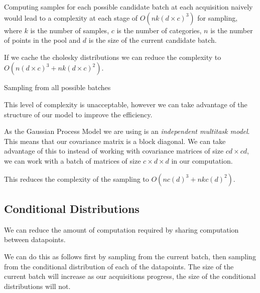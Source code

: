 \documentclass[12pt, a4paper]{report}
\theoremstyle{definition}
\theoremstyle{definition}
\theoremstyle{definition}
\begin{document}
Computing samples for each possible candidate batch at each acquisition naively would lead to a complexity at each stage of $O\left(n k (d \times c)^3 \right)$ for sampling, where $k$ is the number of samples, $c$ is the number of categories, $n$ is the number of points in the pool and $d$ is the size of the current candidate batch.

If we cache the cholesky distributions we can reduce the complexity to $O(n (d \times c)^3  + n k (d \times c)^2)$.

\begin{algorithm}[H]
    \SetAlgoLined
     \caption{Sampling from all possible batches}
\end{algorithm}

This level of complexity is unacceptable, however we can take advantage of the structure of our model to improve the efficiency.

As the Gaussian Process Model we are using is an \textit{independent multitask model}. This means that our covariance matrix is a block diagonal. We can take advantage of this to instead of working with covariance matrices of size $ cd \times cd $, we can work with a batch of matrices of size $c \times d \times d$ in our computation.


This reduces the complexity of the sampling to $O(n c (d)^3  + n k c (d)^2)$.

\subsection{Conditional Distributions}

We can reduce the amount of computation required by sharing computation between datapoints.

We can do this as follows first by sampling from the current batch, then sampling from the conditional distribution of each of the datapoints. The size of the current batch will increase as our acquisitions progress, the size of the conditional distributions will not.
\end{document}
